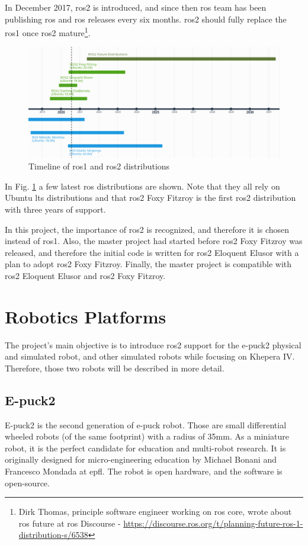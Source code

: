 In December 2017, \ac{ros2} is introduced, and since then \ac{ros} team has been publishing \ac{ros} and \ac{ros} releases every six months.
\ac{ros2} should fully replace the \ac{ros}1 once \ac{ros2} mature\footnote{Dirk Thomas, principle software engineer working on \ac{ros} core, wrote about \ac{ros} future at \ac{ros} Discourse -  \url{https://discourse.ros.org/t/planning-future-ros-1-distribution-s/6538}}.

\begin{figure}[H]
    \centering
    \includegraphics[width=\textwidth]{background/figures/ros_distributions.png}
    \caption{Timeline of \ac{ros}1 and \ac{ros2} distributions}
    \label{fig:background:ros_distributions}
\end{figure}

In Fig. \ref{fig:background:ros_distributions} a few latest \ac{ros} distributions are shown.
Note that they all rely on Ubuntu \ac{lts} distributions and that \ac{ros2} Foxy Fitzroy is the first \ac{ros2} distribution with three years of support.

In this project, the importance of \ac{ros2} is recognized, and therefore it is chosen instead of \ac{ros}1.
Also, the master project had started before \ac{ros2} Foxy Fitzroy was released, and therefore the initial code is written for \ac{ros2} Eloquent Elusor with a plan to adopt \ac{ros2} Foxy Fitzroy.
Finally, the master project is compatible with \ac{ros2} Eloquent Elusor and \ac{ros2} Foxy Fitzroy.

\section{Robotics Platforms}
The project's main objective is to introduce \ac{ros2} support for the e-puck2 physical and simulated robot, and other simulated robots while focusing on Khepera IV.
Therefore, those two robots will be described in more detail.

\subsection{E-puck2}
E-puck2 is the second generation of e-puck robot\cite{mondada_e-puck_nodate}.
Those are small differential wheeled robots (of the same footprint) with a radius of 35mm.
As a miniature robot, it is the perfect candidate for education and multi-robot research.
It is originally designed for micro-engineering education by Michael Bonani and Francesco Mondada at \ac{epfl}.
The robot is open hardware, and the software is open-source.

